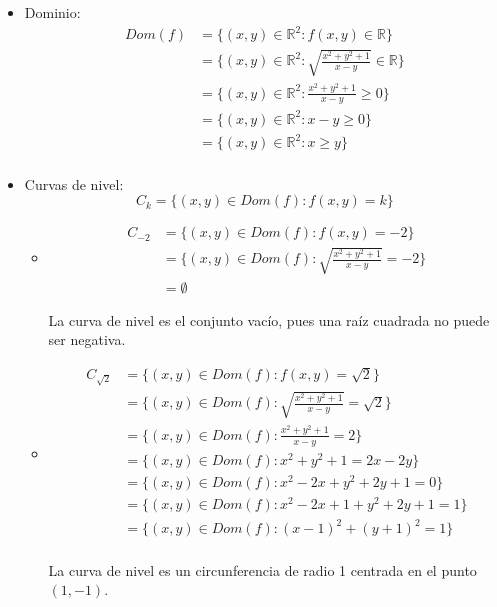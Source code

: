 \documentclass{article}
\newcommand{\R}{\mathbb{R}}
\begin{document}
\begin{itemize}
  \item Dominio:
    \begin{align*}
      Dom(f) &= \{(x, y) \in \R^2 : f(x, y) \in \R \} \\
      &= \{(x, y) \in \R^2 : \sqrt{\frac{x^2 + y^2 + 1}{x - y}} \in \R \} \\
      &= \{(x, y) \in \R^2 : \frac{x^2 + y^2 + 1}{x - y} \geq 0 \} \\
      &= \{(x, y) \in \R^2 : x - y \geq 0 \} \\
      &= \{(x, y) \in \R^2 : x \geq y \} \\
    \end{align*}
    
  \item Curvas de nivel:
    \[
      C_k = \{(x, y) \in Dom(f) : f(x, y) = k\}
    \]

    \begin{itemize}
      \item \begin{align*}
        C_{-2} &= \{(x, y) \in Dom(f) : f(x, y) = -2\} \\
        &= \{(x, y) \in Dom(f) : \sqrt{\frac{x^2 + y^2 + 1}{x - y}} = -2\} \\
        &= \emptyset
      \end{align*}

      La curva de nivel es el conjunto vacío, pues una raíz cuadrada no puede ser negativa.

      \item \begin{align*}
        C_{\sqrt{2}} &= \{(x, y) \in Dom(f) : f(x, y) = \sqrt{2}\} \\
        &= \{(x, y) \in Dom(f) : \sqrt{\frac{x^2 + y^2 + 1}{x - y}} = \sqrt{2}\} \\
        &= \{(x, y) \in Dom(f) : \frac{x^2 + y^2 + 1}{x - y} = 2\} \\
        &= \{(x, y) \in Dom(f) : x^2 + y^2 + 1 = 2x - 2y\} \\
        &= \{(x, y) \in Dom(f) : x^2 - 2x + y^2 + 2y + 1 = 0\} \\
        &= \{(x, y) \in Dom(f) : x^2 - 2x + 1 + y^2 + 2y + 1 = 1\} \\
        &= \{(x, y) \in Dom(f) : (x - 1)^2 + (y + 1)^2 = 1\} \\
      \end{align*}

      La curva de nivel es un circunferencia de radio 1 centrada en el punto $(1, -1)$.


\end{itemize}
\end{itemize}
\end{document}

